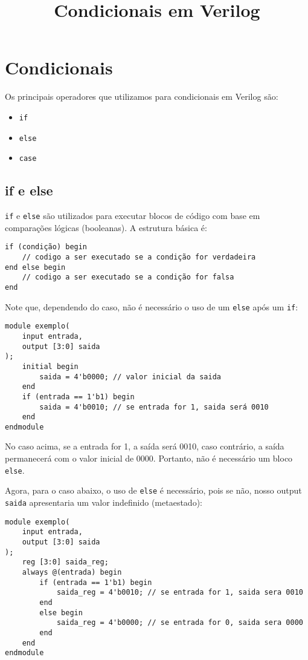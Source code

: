 \documentclass{article}
\title{Condicionais em Verilog}
\date{}
\begin{document}
\maketitle

\section*{Condicionais}

Os principais operadores que utilizamos para condicionais em Verilog são:

\begin{itemize}
  \item \texttt{if} 
  \item \texttt{else}
  \item \texttt{case}
\end{itemize}

\subsection*{if e else}

\texttt{if} e \texttt{else} são utilizados para executar blocos de código com base em comparações lógicas (booleanas). A estrutura básica é:

\begin{lstlisting}
if (condição) begin
    // codigo a ser executado se a condição for verdadeira
end else begin
    // codigo a ser executado se a condição for falsa
end
\end{lstlisting}

Note que, dependendo do caso, não é necessário o uso de um \texttt{else} após um \texttt{if}:

\begin{lstlisting}
module exemplo(
    input entrada,
    output [3:0] saida 
);
    initial begin
        saida = 4'b0000; // valor inicial da saida
    end
    if (entrada == 1'b1) begin
        saida = 4'b0010; // se entrada for 1, saida será 0010
    end
endmodule
\end{lstlisting}

No caso acima, se a entrada for 1, a saída será 0010, caso contrário, a saída permanecerá com o valor inicial de 0000. Portanto, não é necessário um bloco \texttt{else}.

Agora, para o caso abaixo, o uso de \texttt{else} é necessário, pois se não, nosso output \texttt{saida} apresentaria um valor indefinido (metaestado):

\begin{lstlisting}
module exemplo(
    input entrada,
    output [3:0] saida 
);
    reg [3:0] saida_reg;
    always @(entrada) begin
        if (entrada == 1'b1) begin
            saida_reg = 4'b0010; // se entrada for 1, saida sera 0010
        end
        else begin
            saida_reg = 4'b0000; // se entrada for 0, saida sera 0000
        end
    end
endmodule
\end{lstlisting}
\end{document}
